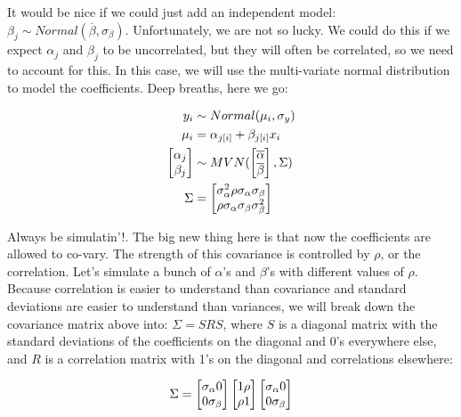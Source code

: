 \documentclass[
  letterpaper,
  DIV=11,
  numbers=noendperiod]{scrartcl}
\begin{document}
It would be nice if we could just add an independent model:
\(\beta_j \sim Normal(\overline{\beta}, \sigma_{\beta})\).
Unfortunately, we are not so lucky. We could do this if we expect
\(\alpha_j\) and \(\beta_j\) to be uncorrelated, but they will often be
correlated, so we need to account for this. In this case, we will use
the multi-variate normal distribution to model the coefficients. Deep
breaths, here we go:

\[
\begin{align*}
y_i &\sim Normal(\mu_i, \sigma_y)\\
\mu_i &= \alpha_{j[i]} + \beta_{j[i]} x_i\\
\begin{bmatrix} \alpha_j \\ \beta_j \end{bmatrix} &\sim MVN(\begin{bmatrix} \overline{\alpha}\\\overline{\beta}\end{bmatrix}, \Sigma)\\
\Sigma &= \begin{bmatrix} \sigma_{\alpha}^2 \space \space \rho\sigma_{\alpha}\sigma_{\beta} \\ \rho\sigma_{\alpha}\sigma_{\beta} \space  \space \sigma_{\beta}^2\end{bmatrix}
\end{align*}
\]

Always be simulatin'!. The big new thing here is that now the
coefficients are allowed to co-vary. The strength of this covariance is
controlled by \(\rho\), or the correlation. Let's simulate a bunch of
\(\alpha\)'s and \(\beta\)'s with different values of \(\rho\). Because
correlation is easier to understand than covariance and standard
deviations are easier to understand than variances, we will break down
the covariance matrix above into: \(\Sigma = SRS\), where \(S\) is a
diagonal matrix with the standard deviations of the coefficients on the
diagonal and 0's everywhere else, and \(R\) is a correlation matrix with
1's on the diagonal and correlations elsewhere:

\[
\Sigma = \begin{bmatrix} \sigma_{\alpha} \space 0 \\ 0 \space \sigma_{\beta} \end{bmatrix}\begin{bmatrix} 1 \space \rho\\ \rho \space 1 \end{bmatrix}\begin{bmatrix} \sigma_{\alpha} \space 0 \\ 0 \space \sigma_{\beta} \end{bmatrix}
\]
\end{document}
